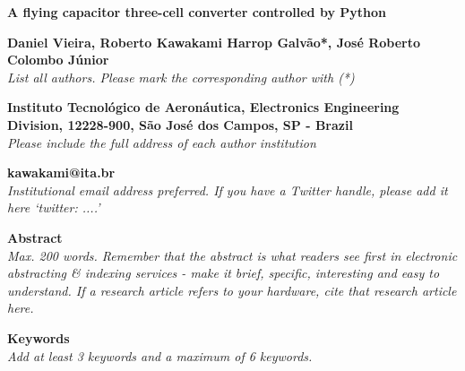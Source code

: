 \documentclass[11pt, letterpaper]{article}
\begin{document}
\begin{flushleft}

{\Huge \bf A flying capacitor three-cell converter controlled by Python} 

\setlength{\parindent}{0pt}
\setlength{\parskip}{10pt}


\textbf{Daniel Vieira, Roberto Kawakami Harrop Galvão*, José Roberto Colombo Júnior}\\ \textit{List all authors. Please mark the corresponding author with (*)}

\textbf{Instituto Tecnológico de Aeronáutica, Electronics Engineering Division, 12228-900, São José dos Campos, SP - Brazil}\\ \textit{Please include the full address of each author institution}

\textbf{kawakami@ita.br}\\ \textit{Institutional email address preferred. If you have a Twitter handle, please add it here ‘twitter: \@....’}

\textbf{Abstract}\\ \textit{Max. 200 words. Remember that the abstract is what readers see first in electronic abstracting \& indexing services - make it brief, specific, interesting and easy to understand. If a research article refers to your hardware, cite that research article here.}

\textbf{Keywords}\\ \textit{Add at least 3 keywords and a maximum of 6 keywords.}


\end{flushleft}
\end{document}
